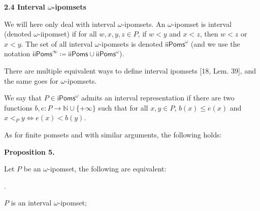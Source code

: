 \documentclass[10pt,a4paper]{article}
\begin{document}
 
\par\medskip\noindent\textbf{2.4 Interval $\omega$-ipomsets}\par
 
 
We will here only deal with interval $\omega$-ipomsets. An $\omega$-ipomset is interval (denoted $\omega$-iipomset) if for all $w,x,y,z\in P$, if $w<y$ and $x<z$, then $w<z$ or $x<y$. The set of all interval $\omega$-ipomsets is denoted ${\mathsf{iiPoms}^{\omega}}$ (and we use the notation ${\mathsf{iiPoms}^{\infty}}\coloneqq\mathsf{iiPoms}\cup{\mathsf{iiPoms}^{\omega}}$).\par
 
 
 
There are multiple equivalent ways to define interval ipomsets [18, Lem. 39], and the same goes for $\omega$-ipomsets.\par
 
 
 
We say that $P\in{\mathsf{iPoms}^{\omega}}$ admits an interval representation if there are two functions ${b,e:P\rightarrow\mathbb{N}\cup{\{+\infty\}}}$ such that for all $x,y\in P$, $b(x)\leqslant e(x)$ and $x<_{P}y\Leftrightarrow e(x)<b(y)$.\par
 
 
 
As for finite pomsets and with similar arguments, the following holds:\par
 
 
 
\par\medskip\noindent\textbf{Proposition 5.}\par
 
 
Let $P$ be an $\omega$-ipomset, the following are equivalent:\par
  
\par{}. 
 
$P$ is an interval $\omega$-ipomset;\par
 
 
\end{document}

